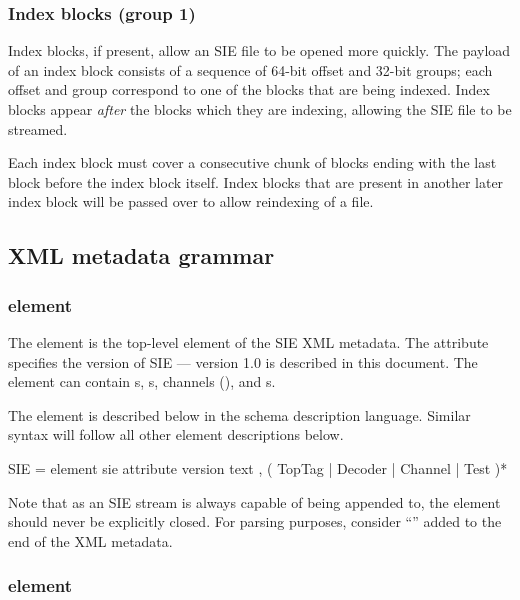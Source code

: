 \documentclass{article}
\newcommand{\siever}{1.0}
\begin{document}
\subsubsection{Index blocks (group 1)}

Index blocks, if present, allow an SIE file to be opened more quickly.
The payload of an index block consists of a sequence of 64-bit offset
and 32-bit groups; each offset and group correspond to one of the
blocks that are being indexed.  Index blocks appear \emph{after} the
blocks which they are indexing, allowing the SIE file to be streamed.

Each index block must cover a consecutive chunk of blocks ending with
the last block before the index block itself.  Index blocks that are
present in another later index block will be passed over to allow
reindexing of a file.

\subsection{XML metadata grammar}

\subsubsection{ element}

The  element is the top-level element of the SIE XML
metadata.  The  attribute specifies the version of
SIE --- version \siever{} is described in this document.  The 
element can contain s, s, channels (),
and s.

The  element is described below in the \relaxng{} schema
description language.  Similar \relaxng{} syntax will follow all
other element descriptions below.

\begin{grammar}
SIE = element sie {
  attribute version { text },
  ( TopTag | Decoder | Channel | Test )*
}
\end{grammar}

Note that as an SIE stream is always capable of being appended to, the
 element should never be explicitly closed.  For parsing
purposes, consider ``'' added to the end of the XML
metadata.

\subsubsection{ element}
\end{document}
